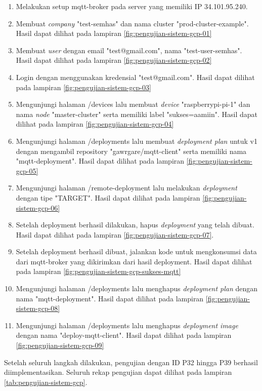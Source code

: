 \begin{enumerate}
    \item Melakukan setup mqtt-broker pada server yang memiliki IP 34.101.95.240.
    \item Membuat \textit{company} "test-semhas" dan nama cluster "prod-cluster-example". Hasil dapat dilihat pada lampiran \ref{fig:pengujian-sistem-gcp-01}
    \item Membuat \textit{user} dengan email "test@gmail.com", nama "test-user-semhas". Hasil dapat dilihat pada lampiran \ref{fig:pengujian-sistem-gcp-02}
    \item Login dengan menggunakan kredensial "test@gmail.com". Hasil dapat dilihat pada lampiran \ref{fig:pengujian-sistem-gcp-03}
    \item Mengunjungi halaman /devices lalu membuat \textit{device} "raspberrypi-pi-1" dan nama \textit{node} "master-cluster" serta memiliki label "sukses=aamiin". Hasil dapat dilihat pada lampiran \ref{fig:pengujian-sistem-gcp-04}
    \item Mengunjungi halaman /deployments lalu membuat \textit{deployment plan} untuk v1 dengan mengambil repository "gawrgare/mqtt-client" serta memiliki nama "mqtt-deployment". Hasil dapat dilihat pada lampiran \ref{fig:pengujian-sistem-gcp-05}
    \item Mengunjungi halaman /remote-deployment lalu melakukan \textit{deployment} dengan tipe "TARGET". Hasil dapat dilihat pada lampiran \ref{fig:pengujian-sistem-gcp-06}
    \item Setelah deployment berhasil dilakukan, hapus \textit{deployment} yang telah dibuat. Hasil dapat dilihat pada lampiran \ref{fig:pengujian-sistem-gcp-07}.
    \item Setelah deployment berhasil dibuat, jalankan kode untuk mengkonsumsi data dari mqtt-broker yang dikirimkan dari hasil deployment. Hasil dapat dilihat pada lampiran \ref{fig:pengujian-sistem-gcp-sukses-mqtt}
    \item Mengunjungi halaman /deployments lalu menghapus \textit{deployment plan} dengan nama "mqtt-deployment". Hasil dapat dilihat pada lampiran \ref{fig:pengujian-sistem-gcp-08}
    \item Mengunjungi halaman /deployments lalu menghapus \textit{deployment image} dengan nama "deploy-mqtt-client". Hasil dapat dilihat pada lampiran \ref{fig:pengujian-sistem-gcp-09}
\end{enumerate}

Setelah seluruh langkah dilakukan, pengujian dengan ID P32 hingga P39 berhasil diimplementasikan. Seluruh rekap pengujian dapat dilihat pada lampiran \ref{tab:pengujian-sistem-gcp}.